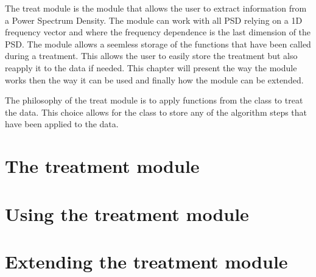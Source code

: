 The treat module is the module that allows the user to extract information from a Power Spectrum Density. The module can work with all PSD relying on a 1D frequency vector and where the frequency dependence is the last dimension of the PSD. The module allows a seemless storage of the functions that have been called during a treatment. This allows the user to easily store the treatment but also reapply it to the data if needed. This chapter will present the way the module works then the way it can be used and finally how the module can be extended.

The philosophy of the treat module is to apply functions from the class to treat the data. This choice allows for the class to store any of the algorithm steps that have been applied to the data. 

\section{The treatment module}
    

\section{Using the treatment module}
    

\section{Extending the treatment module}
    